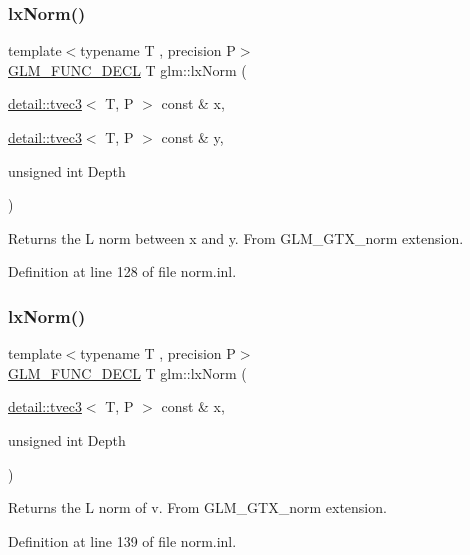 \subsubsection{\texorpdfstring{lx\+Norm()}{lxNorm()}\hspace{0.1cm}{\footnotesize\ttfamily [1/2]}}
{\footnotesize\ttfamily template$<$typename T , precision P$>$ \\
\hyperlink{setup_8hpp_ab2d052de21a70539923e9bcbf6e83a51}{G\+L\+M\+\_\+\+F\+U\+N\+C\+\_\+\+D\+E\+CL} T glm\+::lx\+Norm (\begin{DoxyParamCaption}\item[{\hyperlink{structglm_1_1detail_1_1tvec3}{detail\+::tvec3}$<$ T, P $>$ const \&}]{x,  }\item[{\hyperlink{structglm_1_1detail_1_1tvec3}{detail\+::tvec3}$<$ T, P $>$ const \&}]{y,  }\item[{unsigned int}]{Depth }\end{DoxyParamCaption})}

Returns the L norm between x and y. From G\+L\+M\+\_\+\+G\+T\+X\+\_\+norm extension. 

Definition at line 128 of file norm.\+inl.

\mbox{\label{group__gtx__norm_ga7f76252fa0266db34865dba8a8c0f7d6}} 
\subsubsection{\texorpdfstring{lx\+Norm()}{lxNorm()}\hspace{0.1cm}{\footnotesize\ttfamily [2/2]}}
{\footnotesize\ttfamily template$<$typename T , precision P$>$ \\
\hyperlink{setup_8hpp_ab2d052de21a70539923e9bcbf6e83a51}{G\+L\+M\+\_\+\+F\+U\+N\+C\+\_\+\+D\+E\+CL} T glm\+::lx\+Norm (\begin{DoxyParamCaption}\item[{\hyperlink{structglm_1_1detail_1_1tvec3}{detail\+::tvec3}$<$ T, P $>$ const \&}]{x,  }\item[{unsigned int}]{Depth }\end{DoxyParamCaption})}

Returns the L norm of v. From G\+L\+M\+\_\+\+G\+T\+X\+\_\+norm extension. 

Definition at line 139 of file norm.\+inl.


